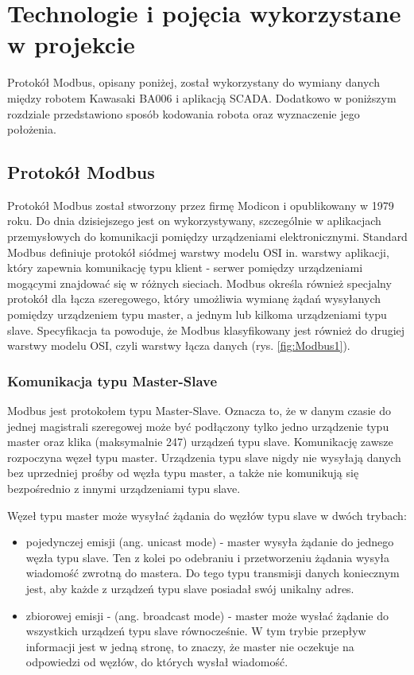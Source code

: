 \chapter{Technologie i pojęcia wykorzystane w projekcie}


 Protokół Modbus, opisany poniżej, został wykorzystany do wymiany danych między robotem Kawasaki BA006 i aplikacją SCADA. Dodatkowo w poniższym rozdziale przedstawiono sposób kodowania robota oraz wyznaczenie jego położenia.  


\section{Protokół Modbus}

Protokół Modbus został stworzony przez firmę Modicon i opublikowany w 1979 roku. Do dnia dzisiejszego jest on wykorzystywany, szczególnie w aplikacjach przemysłowych do komunikacji pomiędzy urządzeniami elektronicznymi. Standard Modbus definiuje protokół siódmej warstwy modelu OSI in. warstwy aplikacji, który zapewnia komunikację typu klient - serwer pomiędzy urządzeniami mogącymi znajdować się w różnych sieciach. Modbus określa również specjalny protokół dla łącza szeregowego, który umożliwia wymianę żądań wysyłanych pomiędzy urządzeniem typu master, a jednym lub kilkoma urządzeniami typu slave. Specyfikacja ta powoduje, że Modbus klasyfikowany jest również do drugiej warstwy modelu OSI, czyli warstwy łącza danych (rys. \ref{fig:Modbus1}).



\subsection{Komunikacja typu Master-Slave}

Modbus jest protokołem typu Master-Slave. Oznacza to, że w danym czasie do jednej magistrali szeregowej może być podłączony tylko jedno urządzenie typu master oraz klika (maksymalnie 247) urządzeń typu slave. Komunikację zawsze rozpoczyna węzeł typu master. Urządzenia typu slave nigdy nie wysyłają danych bez uprzedniej prośby od węzła typu master, a także nie komunikują się bezpośrednio z innymi urządzeniami typu slave. 

Węzeł typu master może wysyłać żądania do węzłów typu slave w dwóch trybach:

\begin{itemize}
	\item pojedynczej emisji (ang. unicast mode) - master wysyła żądanie do jednego węzła typu slave. Ten z kolei po odebraniu i przetworzeniu żądania wysyła wiadomość zwrotną do mastera. Do tego typu transmisji danych koniecznym jest, aby każde z urządzeń typu slave posiadał swój unikalny adres.
	\item zbiorowej emisji -  (ang. broadcast mode) - master może wysłać żądanie do wszystkich urządzeń typu slave równocześnie. W tym trybie przepływ informacji jest w jedną stronę, to znaczy, że master nie oczekuje na odpowiedzi od węzłów, do których wysłał wiadomość.
\end{itemize}



